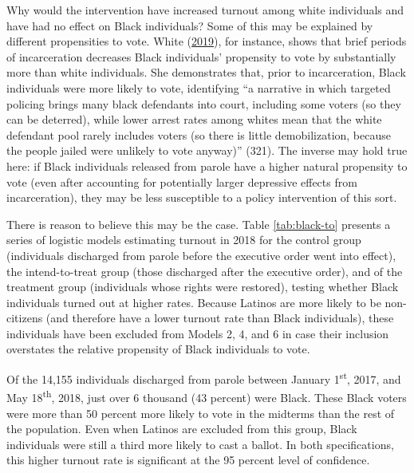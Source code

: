 \documentclass[
  12pt,
]{article}
\begin{document}
Why would the intervention have increased turnout among white individuals and have had no effect on Black individuals? Some of this may be explained by different propensities to vote. White (\protect\hyperlink{ref-White2019}{2019}), for instance, shows that brief periods of incarceration decreases Black individuals' propensity to vote by substantially more than white individuals. She demonstrates that, prior to incarceration, Black individuals were more likely to vote, identifying ``a narrative in which targeted policing brings many black defendants into court, including some voters (so they can be deterred), while lower arrest rates among whites mean that the white defendant pool rarely includes voters (so there is little demobilization, because the people jailed were unlikely to vote anyway)'' (321). The inverse may hold true here: if Black individuals released from parole have a higher natural propensity to vote (even after accounting for potentially larger depressive effects from incarceration), they may be less susceptible to a policy intervention of this sort.

There is reason to believe this may be the case. Table \ref{tab:black-to} presents a series of logistic models estimating turnout in 2018 for the control group (individuals discharged from parole before the executive order went into effect), the intend-to-treat group (those discharged after the executive order), and of the treatment group (individuals whose rights were restored), testing whether Black individuals turned out at higher rates. Because Latinos are more likely to be non-citizens (and therefore have a lower turnout rate than Black individuals), these individuals have been excluded from Models 2, 4, and 6 in case their inclusion overstates the relative propensity of Black individuals to vote.

\begin{singlespace}


\end{singlespace}

Of the 14,155 individuals discharged from parole between January 1\textsuperscript{st}, 2017, and May 18\textsuperscript{th}, 2018, just over 6 thousand (43 percent) were Black. These Black voters were more than 50 percent more likely to vote in the midterms than the rest of the population. Even when Latinos are excluded from this group, Black individuals were still a third more likely to cast a ballot. In both specifications, this higher turnout rate is significant at the 95 percent level of confidence.
\end{document}
